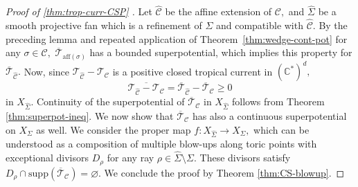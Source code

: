 \documentclass[11pt]{amsart}
\def\Log{{\rm Log}}
\theoremstyle{definition}
\newcommand{\lto}{\longrightarrow}
\newcommand{\C}{\mathbb{C}}
\newcommand{\trop}{\mathrm{trop}}
\newcommand{\cC}{\mathcal{C}}
\newcommand{\sT}{\mathscr{T}}
\newcommand{\fq}{\mathfrak{q}}
\newcommand{\supp}[1]{{\mathrm{supp}(#1)}}
\begin{document}
\begin{proof}[Proof of \ref{thm:trop-curr-CSP} ]
  Let $ \widehat{\cC}$ be the affine extension of $\cC,$ and $\widehat{\Sigma}$ be a smooth projective fan which is a refinement of $\Sigma$ and compatible with $\widehat{\cC}.$ 
  By the preceding lemma and repeated application of Theorem~\ref{thm:wedge-cont-pot} for any $\sigma \in \cC,$ $\overline{\sT}_{\text{aff}(\sigma)}$ has a bounded superpotential, which implies this property for $\overline{\sT}_{\widehat{\cC}}.$ Now, since $\sT_{\widehat{\cC}} - \sT_{{\cC}}$ is a positive closed tropical current in $(\C^*)^d,$ $$ \overline{\sT_{\widehat{\cC}} - \sT_{\cC}} = \overline{\sT}_{\widehat{\cC}} - \overline{\sT}_{\cC}\geq 0
$$ in $X_{\widehat{\Sigma}}.$ Continuity of the superpotential of $\overline{\sT}_{\cC}$ in $X_{\widehat{\Sigma}}$ follows from Theorem \ref{thm:superpot-ineq}. 
\vskip 2mm
We now show that $\overline{\sT}_{\cC}$ has also a continuous superpotential on $X_{\Sigma}$ as well. We consider the proper map $f: X_{\widehat{\Sigma}} \lto X_{\Sigma},$ which can be understood as a composition of multiple blow-ups along toric points with exceptional divisors $D_{\rho}$ for any ray $\rho \in \widehat{\Sigma}\setminus \Sigma.$ These divisors satisfy $D_{\rho} \cap \supp{ \overline{\sT}_{\cC}} = \varnothing.$ We conclude the proof by Theorem \ref{thm:CS-blowup}.
\end{proof}


\end{document}
